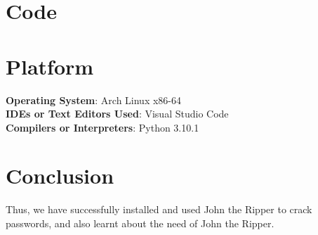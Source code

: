 \documentclass[11pt]{article}
\begin{document}
\section{Code}



\section{Platform}
\textbf{Operating System}: Arch Linux x86-64 \\
\textbf{IDEs or Text Editors Used}: Visual Studio Code\\
\textbf{Compilers or Interpreters}: Python 3.10.1\\

\section{Conclusion}
Thus, we have successfully installed and used John the Ripper to crack
passwords, and also learnt about the need of John the Ripper.

\clearpage
\end{document}
